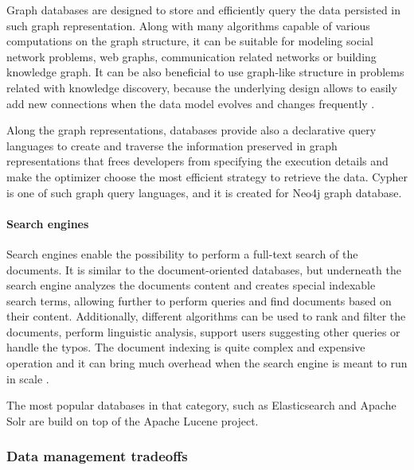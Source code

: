 Graph databases are designed to store and efficiently query the data persisted in such graph representation. Along with many algorithms capable of various computations on the graph structure, it can be suitable for modeling social network problems, web graphs, communication related networks or building knowledge graph. It can be also beneficial to use graph-like structure in problems related with knowledge discovery, because the underlying design allows to easily add new connections when the data model evolves and changes frequently \cite{DesignDataIntensiveApplications}.

Along the graph representations, databases provide also a declarative query languages to create and traverse the information preserved in graph representations that frees developers from specifying the execution details and make the optimizer choose the most efficient strategy to retrieve the data. Cypher is one of such graph query languages, and it is created for Neo4j \cite{Neo4j} graph database.

\paragraph{Search engines}

Search engines enable the possibility to perform a full-text search of the documents. It is similar to the document-oriented databases, but underneath the search engine analyzes the documents content and creates special indexable search terms, allowing further to perform queries and find documents based on their content. Additionally, different algorithms can be used to rank and filter the documents, perform linguistic analysis, support users suggesting other queries or handle the typos. The document indexing is quite complex and expensive operation and it can bring much overhead when the search engine is meant to run in scale \cite{DesignDataIntensiveApplications}. 

The most popular databases in that category, such as Elasticsearch \cite{Elasticsearch} and Apache Solr \cite{ApacheSolr} are build on top of the Apache Lucene project.

\subsubsection{Data management tradeoffs} \label{chapter:database-management-tradeoffs}



